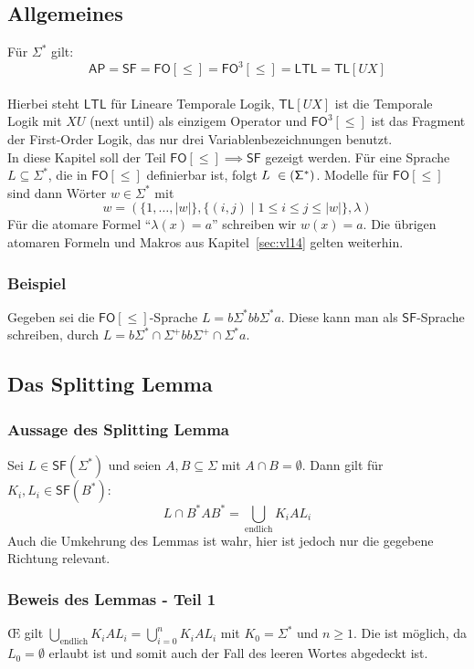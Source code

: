 \documentclass[12pt, german]{article}
\newcommand{\sigstern}{\Sigma^\ast}
\newcommand{\starfree}{\mathsf{SF}}
\newcommand{\bast}{B^{\ast}}
\newcommand{\fo}{\mathsf{FO}}
\newcommand{\ap}{\mathsf{AP}}
\newcommand{\ltl}{\mathsf{LTL}}
\newcommand{\tl}{\mathsf{TL}}
\begin{document}
\subsection{Allgemeines}
	Für $\sigstern$ gilt: $$\ap = \starfree = \fo[\leq] = \fo^3[\leq] = \ltl = \tl[UX]$$ \\
	Hierbei steht $\ltl$ für Lineare Temporale Logik, $\tl[UX]$ ist die Temporale Logik mit $XU$ (next until) als einzigem Operator und $\fo^3[\leq]$ ist das Fragment der First-Order Logik, das nur drei Variablenbezeichnungen benutzt.\\
	
	In diese Kapitel soll der Teil $\fo[\leq] \implies \starfree$ gezeigt werden. Für eine Sprache $L \subseteq \sigstern$, die in $\fo[\leq]$ definierbar ist, folgt $L \in \sf(\sigstern)$. 
	Modelle für $\fo[\leq]$ sind dann Wörter $w \in \sigstern$ mit $$w = (\{1, \ldots, |w|\}, \{(i,j) \mid 1 \leq i \leq j \leq |w|\}, \lambda)$$
	Für die atomare Formel ``$\lambda(x) =a$'' schreiben wir $w(x) = a$.
	Die übrigen atomaren Formeln und Makros aus Kapitel~\ref{sec:vl14} gelten weiterhin.

\subsubsection{Beispiel}
	Gegeben sei die $\fo[\leq]$-Sprache $L = b\sigstern bb \sigstern a $. 
	Diese kann man als $\starfree$-Sprache schreiben, durch $L = b \sigstern \cap \Sigma^+bb\Sigma^+ \cap \sigstern a$.

\subsection{Das Splitting Lemma}
\subsubsection{Aussage des Splitting Lemma}
	Sei $L \in \starfree(\sigstern)$ und seien $A, B \subseteq \Sigma$ mit $A \cap B = \emptyset$. Dann gilt für $K_i, L_i \in \starfree(\bast)$: $$L \cap \bast A \bast= \bigcup_{\text{endlich}} K_iAL_i$$
	Auch die Umkehrung des Lemmas ist wahr, hier ist jedoch nur die gegebene Richtung relevant.
	
\subsubsection{Beweis des Lemmas - Teil 1\label{Beweis: 1}}
	\OE\hspace{1pt} gilt $\bigcup_{\text{endlich}} K_iAL_i = \bigcup_{i = 0}^n K_iAL_i$ mit $K_0 = \sigstern$ und $n \geq 1$. Die ist möglich, da $L_0 = \emptyset$ erlaubt ist und somit auch der Fall des leeren Wortes abgedeckt ist. \newline
	
\end{document}

